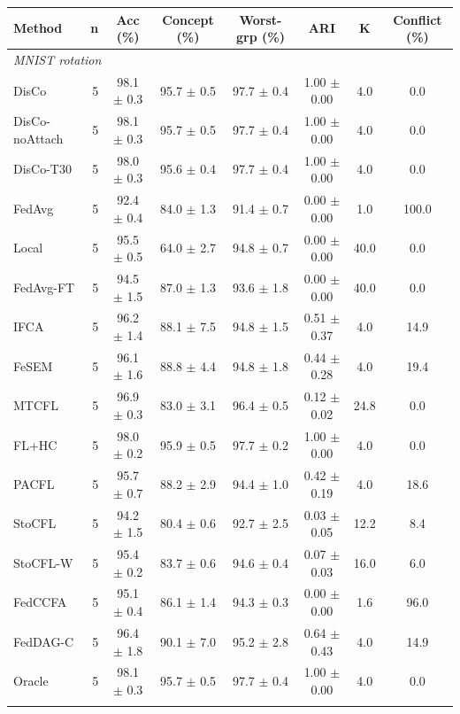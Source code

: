 {\scriptsize
\begin{tabular}{l r c c c c c c}
\toprule
Method & n & Acc (\%) & Concept (\%) & Worst-grp (\%) & ARI & K & Conflict (\%) \\
\midrule
\multicolumn{8}{l}{\textit{MNIST rotation}} \\
DisCo & 5 & 98.1 $\pm$ 0.3 & 95.7 $\pm$ 0.5 & 97.7 $\pm$ 0.4 & 1.00 $\pm$ 0.00 & 4.0 & 0.0 \\
DisCo-noAttach & 5 & 98.1 $\pm$ 0.3 & 95.7 $\pm$ 0.5 & 97.7 $\pm$ 0.4 & 1.00 $\pm$ 0.00 & 4.0 & 0.0 \\
DisCo-T30 & 5 & 98.0 $\pm$ 0.3 & 95.6 $\pm$ 0.4 & 97.7 $\pm$ 0.4 & 1.00 $\pm$ 0.00 & 4.0 & 0.0 \\
FedAvg & 5 & 92.4 $\pm$ 0.4 & 84.0 $\pm$ 1.3 & 91.4 $\pm$ 0.7 & 0.00 $\pm$ 0.00 & 1.0 & 100.0 \\
Local & 5 & 95.5 $\pm$ 0.5 & 64.0 $\pm$ 2.7 & 94.8 $\pm$ 0.7 & 0.00 $\pm$ 0.00 & 40.0 & 0.0 \\
FedAvg-FT & 5 & 94.5 $\pm$ 1.5 & 87.0 $\pm$ 1.3 & 93.6 $\pm$ 1.8 & 0.00 $\pm$ 0.00 & 40.0 & 0.0 \\
IFCA & 5 & 96.2 $\pm$ 1.4 & 88.1 $\pm$ 7.5 & 94.8 $\pm$ 1.5 & 0.51 $\pm$ 0.37 & 4.0 & 14.9 \\
FeSEM & 5 & 96.1 $\pm$ 1.6 & 88.8 $\pm$ 4.4 & 94.8 $\pm$ 1.8 & 0.44 $\pm$ 0.28 & 4.0 & 19.4 \\
MTCFL & 5 & 96.9 $\pm$ 0.3 & 83.0 $\pm$ 3.1 & 96.4 $\pm$ 0.5 & 0.12 $\pm$ 0.02 & 24.8 & 0.0 \\
FL+HC & 5 & 98.0 $\pm$ 0.2 & 95.9 $\pm$ 0.5 & 97.7 $\pm$ 0.2 & 1.00 $\pm$ 0.00 & 4.0 & 0.0 \\
PACFL & 5 & 95.7 $\pm$ 0.7 & 88.2 $\pm$ 2.9 & 94.4 $\pm$ 1.0 & 0.42 $\pm$ 0.19 & 4.0 & 18.6 \\
StoCFL & 5 & 94.2 $\pm$ 1.5 & 80.4 $\pm$ 0.6 & 92.7 $\pm$ 2.5 & 0.03 $\pm$ 0.05 & 12.2 & 8.4 \\
StoCFL-W & 5 & 95.4 $\pm$ 0.2 & 83.7 $\pm$ 0.6 & 94.6 $\pm$ 0.4 & 0.07 $\pm$ 0.03 & 16.0 & 6.0 \\
FedCCFA & 5 & 95.1 $\pm$ 0.4 & 86.1 $\pm$ 1.4 & 94.3 $\pm$ 0.3 & 0.00 $\pm$ 0.00 & 1.6 & 96.0 \\
FedDAG-C & 5 & 96.4 $\pm$ 1.8 & 90.1 $\pm$ 7.0 & 95.2 $\pm$ 2.8 & 0.64 $\pm$ 0.43 & 4.0 & 14.9 \\
Oracle & 5 & 98.1 $\pm$ 0.3 & 95.7 $\pm$ 0.5 & 97.7 $\pm$ 0.4 & 1.00 $\pm$ 0.00 & 4.0 & 0.0 \\
\addlinespace
\multicolumn{8}{l}{\textit{MNIST label swap}} \\

\end{tabular}}
